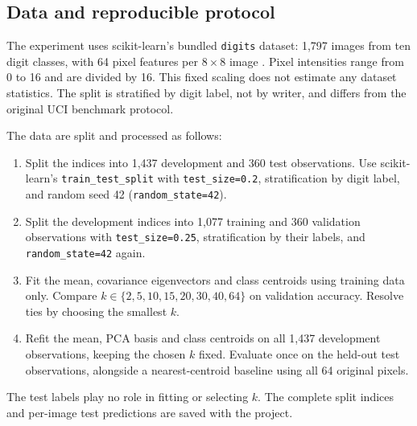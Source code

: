 \documentclass[11pt,a4paper,english]{article}
\numberwithin{equation}{section}
\begin{document}
\subsection{Data and reproducible protocol}
The experiment uses scikit-learn's bundled \texttt{digits} dataset: 1,797 images from ten digit classes, with 64 pixel features per $8\times8$ image \cite{digits}. Pixel intensities range from 0 to 16 and are divided by 16. This fixed scaling does not estimate any dataset statistics. The split is stratified by digit label, not by writer, and differs from the original UCI benchmark protocol.

The data are split and processed as follows:
\begin{enumerate}
\item Split the indices into 1,437 development and 360 test observations. Use scikit-learn's \texttt{train\_test\_split} with \texttt{test\_size=0.2}, stratification by digit label, and random seed 42 (\texttt{random\_state=42}).
\item Split the development indices into 1,077 training and 360 validation observations with \texttt{test\_size=0.25}, stratification by their labels, and \texttt{random\_state=42} again.
\item Fit the mean, covariance eigenvectors and class centroids using training data only. Compare $k\in\{2,5,10,15,20,30,40,64\}$ on validation accuracy. Resolve ties by choosing the smallest $k$.
\item Refit the mean, PCA basis and class centroids on all 1,437 development observations, keeping the chosen $k$ fixed. Evaluate once on the held-out test observations, alongside a nearest-centroid baseline using all 64 original pixels.
\end{enumerate}
The test labels play no role in fitting or selecting $k$. The complete split indices and per-image test predictions are saved with the project.

\clearpage
\end{document}
